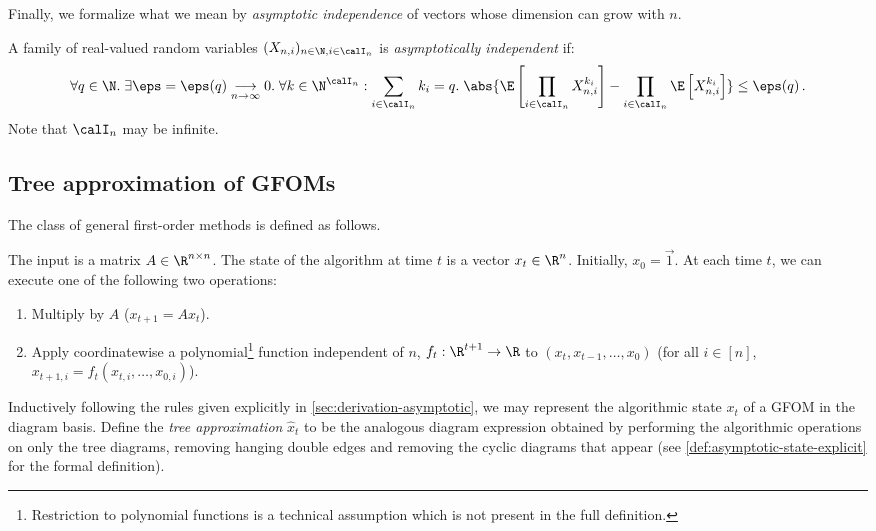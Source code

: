 \documentclass[12pt]{article}
\begin{document}
Finally, we formalize what we mean by \textit{asymptotic independence} of vectors whose dimension can grow with $n$.
\begin{definition}
\label{def:asymptotic-indpt}
    A family of real-valued random variables $(X_{n,i})_{n\in\N,i\in \calI_n}$ is \textit{asymptotically independent} if:
    \[ \forall q \in \N.\; \exists \eps=\eps(q) \underset{n\to\infty}{\longrightarrow} 0. \; \forall k  \in \N^{\calI_n} : \sum_{i \in \calI_n} k_i = q.\;
    \abs{\E\left[ \prod_{i \in \calI_n} X_{n,i}^{k_i}\right] - \prod_{i \in \calI_n}\E\left[X_{n,i}^{k_i}\right]} \le \eps(q)\,.\]
    Note that $\calI_n$ may be infinite.
\end{definition}




\subsection{Tree approximation of GFOMs}
\label{sec:gfom}


The class of general first-order methods is defined as follows.
\begin{definition}
\label{def:gfom}
The input is a matrix $A \in \R^{n \times n}$.
The state of the algorithm at time $t$
is a vector $x_t \in \R^n$. Initially, $x_0=\vec{1}$.
At each time $t$, we can execute one of the following two operations:
\begin{enumerate}
    \item Multiply by $A$ ($x_{t+1} = Ax_t$).
    \item Apply coordinatewise a polynomial\footnote{Restriction to polynomial functions is a technical assumption which is not present in the full definition.} function independent of $n$, $f_t : \R^{t+1} \to \R$ to $(x_t, x_{t-1}, \dots, x_0)$ (for all $i \in [n]$, $x_{t+1,i}=f_t(x_{t,i},\ldots,x_{0,i})$).
\end{enumerate}
\end{definition}

Inductively following the rules given explicitly in \cref{sec:derivation-asymptotic},
we may represent the algorithmic state $x_t$ of a GFOM in the diagram
basis.
Define the \emph{tree approximation} $\widehat{x}_t$ to be the analogous diagram expression obtained by performing the algorithmic operations on only the tree diagrams, removing hanging double edges and removing the cyclic diagrams that appear (see \cref{def:asymptotic-state-explicit} for the formal definition).
\end{document}
